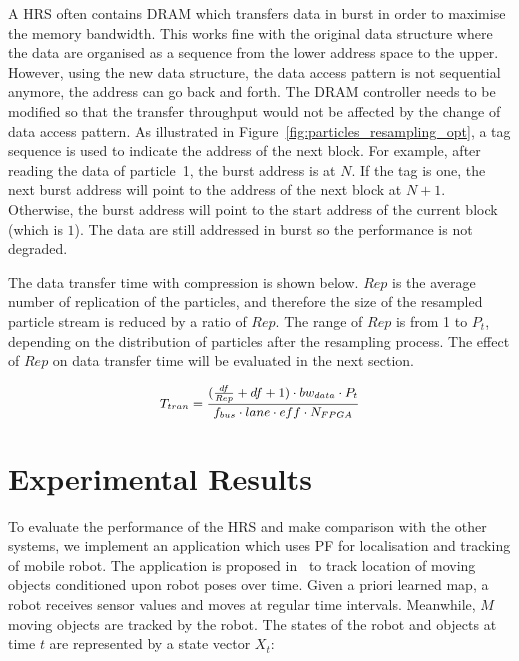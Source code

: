 A HRS often contains DRAM which transfers data in burst in order to maximise the memory bandwidth.
This works fine with the original data structure where the data are organised as a sequence from the lower address space to the upper.
However, using the new data structure, the data access pattern is not sequential anymore, the address can go back and forth.
The DRAM controller needs to be modified so that the transfer throughput would not be affected by the change of data access pattern.
As illustrated in Figure~\ref{fig:particles_resampling_opt}, a tag sequence is used to indicate the address of the next block.
For example, after reading the data of particle~1, the burst address is at $N$.
If the tag is one, the next burst address will point to the address of the next block at $N+1$.
Otherwise, the burst address will point to the start address of the current block (which is $1$).
The data are still addressed in burst so the performance is not degraded.

The data transfer time with compression is shown below. 
$Rep$ is the average number of replication of the particles,
and therefore the size of the resampled particle stream is reduced by a ratio of $Rep$.
The range of $Rep$ is from 1 to $P_t$, depending on the distribution of particles after the resampling process.
The effect of $Rep$ on data transfer time will be evaluated in the next section.

\begin{equation}
\small
\begin{aligned}
T_{tran} = \frac{(\frac{df}{Rep} + df + 1) \cdot bw_{data} \cdot P_t}{f_{bus} \cdot lane \cdot eff \cdot N_{FPGA}}
\end{aligned}
\label{eqt:data_opt}
\end{equation}

\section{Experimental Results}
\label{sec:results}

To evaluate the performance of the HRS and make comparison with the other systems, 
we implement an application which uses PF for localisation and tracking of mobile robot.
The application is proposed in~\cite{montemerlo02} to track location of moving objects conditioned upon robot poses over time.
Given a priori learned map, a robot receives sensor values and moves at regular time intervals. 
Meanwhile, $M$ moving objects are tracked by the robot.
The states of the robot and objects at time $t$ are represented by a state vector $X_t$:
 
